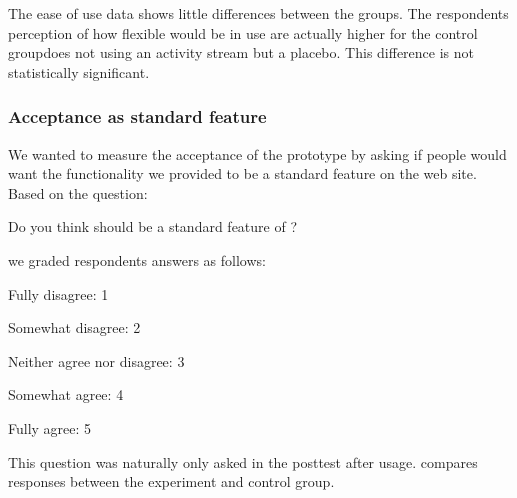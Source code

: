 The ease of use data shows little differences between the groups. The
respondents perception of how flexible \latest{} would be in use are
actually higher for the control group\dash{}does not using an activity stream
but a placebo. This difference is not statistically significant.

\subsubsection{Acceptance as standard feature}

We wanted to measure the acceptance of the prototype by asking if people would
want the functionality we provided to be a standard feature on the \urort{}
web site. Based on the question:

\begin{items}
  \item Do you think \latest{} should be a standard feature of \urort{}?
\end{items}

we graded respondents answers as follows:

\begin{items}
  \item Fully disagree: 1
  \item Somewhat disagree: 2
  \item Neither agree nor disagree: 3
  \item Somewhat agree: 4
  \item Fully agree: 5
\end{items}

This question was naturally only asked in the posttest after usage.
 compares responses between the
experiment and control group.

